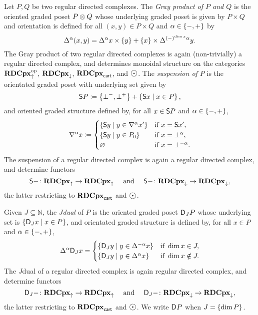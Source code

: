 Let \( P, Q \) be two regular directed complexes.
The \emph{Gray product of \( P \) and \( Q \)} is the oriented graded poset \( P \gray Q \) whose underlying graded poset is given by \( P \times Q \) and orientation is defined for all \( (x, y) \in P \times Q \) and \( \a \in \set{-, +} \) by
\begin{equation*}
    \faces{}{\a} (x, y) = \faces{}{\a} x \times \set{y} + \set{x} \times \faces{}{(-)^{\dim x} \a} y.
\end{equation*}  
The Gray product of two regular directed complexes is again (non-trivially) a regular directed complex, and determines monoidal structure on the categories \( \opp{\rdcpxcomap} \), \( \rdcpxmap \), \( \rdcpxcart \), and \( \atom \).
The \emph{suspension of \( P \)} is the orientated graded poset with underlying set given by
\begin{equation*}
    \sus{P} \eqdef \set{\bot^-, \bot^+} + \set{\sus{x} \mid x \in P},
\end{equation*}
and oriented graded structure defined by, for all \( x \in \sus{P} \) and \( \a \in \set{-, +} \),
\begin{equation*}
    \cofaces{}{\a} x \eqdef 
    \begin{cases}
        \set{\sus{y} \mid y \in \cofaces{}{\a} x'} & \text{if } x = \sus{x'}, \\
        \set{\sus{y} \mid y \in \gr{0}{P}} & \text{if } x = \bot^\a, \\
        \varnothing & \text{if } x = \bot^{- \a}.
    \end{cases}
\end{equation*}
The suspension of a regular directed complex is again a regular directed complex, and determine functors
\begin{equation*}
    \sus{-} \colon \rdcpxcomap \to \rdcpxcomap \quad\text{ and }\quad \sus{-} \colon \rdcpxmap \to \rdcpxmap,
\end{equation*}
the latter restricting to \( \rdcpxcart \) and \( \atom \).

Given \( J \subseteq \mathbb{N} \), the \emph{\( J \)\nbd dual} of \( P \) is the oriented graded poset \( \dual{J}{P} \) whose underlying set is \( \set{\dual{J}{x} \mid x \in P} \), and orientated graded structure is defined by, for all \( x \in P \) and \( \a \in \set{-, +} \),
\begin{equation*}
    \faces{}{\a} \dual{J}{x} = 
    \begin{cases}
        \set{\dual{J}{y} \mid y \in \faces{}{-\a} x} & \text{if } \dim x \in J,\\
        \set{\dual{J}{y} \mid y \in \faces{}{\a} x}  & \text{if } \dim x \notin J.
    \end{cases}
\end{equation*}
The \( J \)\nbd dual of a regular directed complex is again regular directed complex, and determine functors 
\begin{equation*}
    \dual{J}{-} \colon \rdcpxcomap \to \rdcpxcomap \quad\text{ and }\quad \dual{J}{-} \colon \rdcpxmap \to \rdcpxmap,
\end{equation*}
the latter restricting to \( \rdcpxcart \) and \( \atom \).
We write \( \dual{}{P} \) when \( J = \set{\dim P} \).

